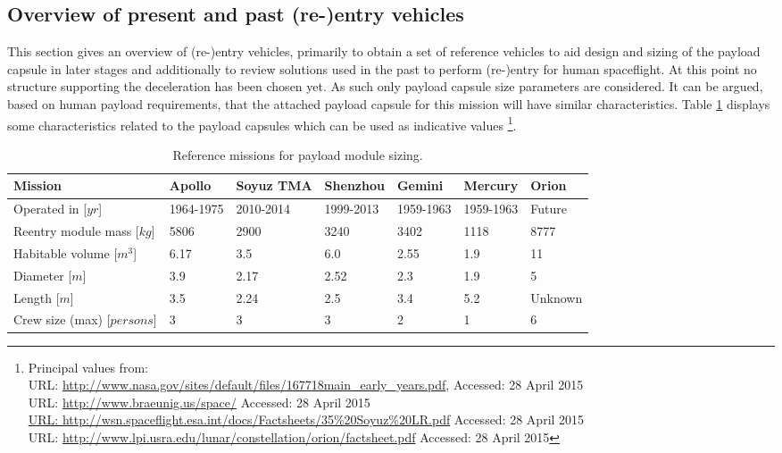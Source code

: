 \subsection{Overview of present and past (re-)entry vehicles}\label{cha:past missions}
This section gives an overview of (re-)entry vehicles, primarily to obtain a set of reference vehicles to aid design and sizing of the payload capsule in later stages and additionally to review solutions used in the past to perform (re-)entry for human spaceflight. At this point no structure supporting the deceleration has been chosen yet. As such only payload capsule size parameters are considered. It can be argued, based on human payload requirements, that the attached payload capsule for this mission will have similar characteristics. Table \ref{tab:refmis} displays some characteristics related to the payload capsules which can be used as indicative values \footnote{Principal values from: \\
URL: \url{http://www.nasa.gov/sites/default/files/167718main\_early\_years.pdf},  Accessed: 28 April 2015 \\ URL: \url{http://www.braeunig.us/space/} Accessed: 28 April 2015 \\ \url{URL: http://wsn.spaceflight.esa.int/docs/Factsheets/35\%20Soyuz\%20LR.pdf} Accessed: 28 April 2015 \\
URL: \url{http://www.lpi.usra.edu/lunar/constellation/orion/factsheet.pdf} Accessed: 28 April 2015}. 

\begin{table}[H]
	\caption[Reference missions for payload module sizing]{Reference missions for payload module sizing.}
		\begin{tabular}{|p{}|p{}|p{}|p{}|p{}|p{}|p{}|} %
			\hline
			Mission 						& Apollo & 	Soyuz TMA &	Shenzhou & Gemini & Mercury & Orion \\ \hline \hline
			Operated in [$yr$]					&	1964-1975	& 	2010-2014&	1999-2013 &   1959-1963  & 1959-1963 & Future \\ \hline
			Reentry module mass [$kg$]  	&	5806& 	2900 &	3240 & 3402 & 1118 & 8777 \\ \hline
			Habitable volume [$m^3$]		&	6.17& 	3.5  &	6.0  & 2.55 & 1.9 & 11   \\ \hline
			Diameter [$m$]			 		&	3.9 & 	2.17  &	2.52 & 2.3 & 1.9 & 5   \\ \hline
			Length  [$m$]			 		&	3.5 & 	2.24  &	2.5  & 3.4 &  5.2 & Unknown  \\ \hline
			Crew size (max) [$persons$]		&	3   & 	3     &	3    & 2   &  1   & 6   \\ \hline
		\end{tabular}
    \label{tab:refmis}
\end{table}

